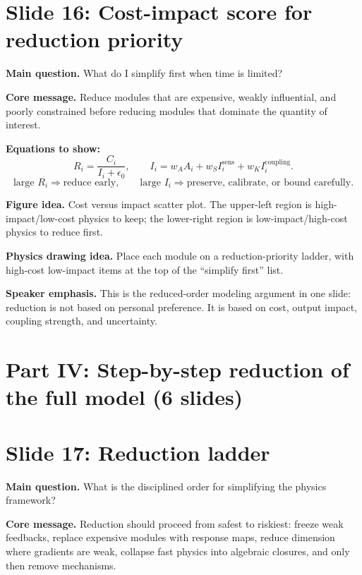 \documentclass[11pt]{article}
\begin{document}
\section{Slide 16: Cost-impact score for reduction priority}
\begin{physicsbox}
\textbf{Main question.} What do I simplify first when time is limited?
\end{physicsbox}

\textbf{Core message.} Reduce modules that are expensive, weakly influential, and poorly constrained before reducing modules that dominate the quantity of interest.

\textbf{Equations to show:}
\begin{equation*}
R_i=\frac{C_i}{I_i+\epsilon_0},
\qquad
I_i=w_A A_i+w_S I_i^{\mathrm{sens}}+w_K I_i^{\mathrm{coupling}}.
\end{equation*}
\begin{equation*}
\text{large }R_i\Rightarrow\text{reduce early},
\qquad
\text{large }I_i\Rightarrow\text{preserve, calibrate, or bound carefully}.
\end{equation*}

\textbf{Figure idea.} Cost versus impact scatter plot. The upper-left region is high-impact/low-cost physics to keep; the lower-right region is low-impact/high-cost physics to reduce first.

\textbf{Physics drawing idea.} Place each module on a reduction-priority ladder, with high-cost low-impact items at the top of the ``simplify first'' list.

\textbf{Speaker emphasis.} This is the reduced-order modeling argument in one slide: reduction is not based on personal preference. It is based on cost, output impact, coupling strength, and uncertainty.

\section{Part IV: Step-by-step reduction of the full model (6 slides)}

\section{Slide 17: Reduction ladder}
\begin{physicsbox}
\textbf{Main question.} What is the disciplined order for simplifying the physics framework?
\end{physicsbox}

\textbf{Core message.} Reduction should proceed from safest to riskiest: freeze weak feedbacks, replace expensive modules with response maps, reduce dimension where gradients are weak, collapse fast physics into algebraic closures, and only then remove mechanisms.
\end{document}
